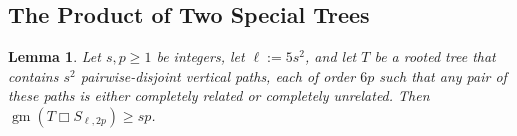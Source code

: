 \documentclass{patmorin}
\newcommand{\boxprod}{\mathbin{\Box}}
\renewcommand{\ge}{\geqslant}
\renewcommand{\le}{\leqslant}
\DeclareMathOperator{\gm}{gm}
\theoremstyle{plain}
\newtheorem{lem}[thm]{Lemma}
\theoremstyle{definition}
\begin{document}
%
%

\subsection{The Product of Two Special Trees}


\begin{lem}\label{star_times_star}
  Let $s,p\ge 1$ be integers, let $\ell:=5s^2$, and let $T$ be a rooted tree that contains $s^2$ pairwise-disjoint vertical paths, each of order $6p$ such that any pair of these paths is either completely related or completely unrelated.  Then $\gm(T\boxprod S_{\ell,2p})\ge sp$.
\end{lem}
\end{document}
